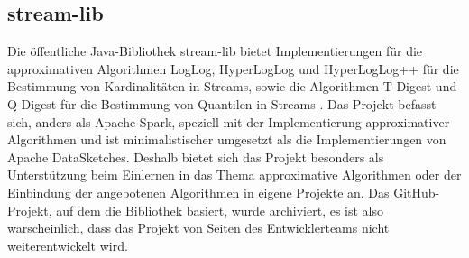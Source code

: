 \subsection{stream-lib}
Die öffentliche Java-Bibliothek stream-lib bietet Implementierungen für die approximativen Algorithmen LogLog, 
HyperLogLog und HyperLogLog++ für die Bestimmung von Kardinalitäten in Streams, 
sowie die Algorithmen T-Digest und Q-Digest für die Bestimmung von Quantilen in Streams \cite{streamlib2019}. 
Das Projekt befasst sich, anders als Apache Spark, speziell mit der Implementierung approximativer Algorithmen und ist minimalistischer umgesetzt als die Implementierungen von Apache DataSketches. Deshalb bietet sich das Projekt besonders als Unterstützung beim Einlernen in das Thema approximative Algorithmen oder der Einbindung der angebotenen Algorithmen in eigene Projekte an.
Das GitHub-Projekt, auf dem die Bibliothek basiert, wurde archiviert, 
es ist also warscheinlich, dass das Projekt von Seiten des Entwicklerteams nicht weiterentwickelt wird.